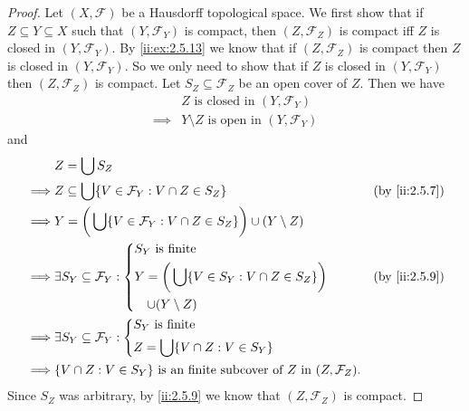 \begin{proof}
  Let \((X, \mathcal{F})\) be a Hausdorff topological space.
  We first show that if \(Z \subseteq Y \subseteq X\) such that \((Y, \mathcal{F}_Y)\) is compact, then \((Z, \mathcal{F}_Z)\) is compact iff \(Z\) is closed in \((Y, \mathcal{F}_Y)\).
  By \cref{ii:ex:2.5.13} we know that if \((Z, \mathcal{F}_Z)\) is compact then \(Z\) is closed in \((Y, \mathcal{F}_Y)\).
  So we only need to show that if \(Z\) is closed in \((Y, \mathcal{F}_Y)\) then \((Z, \mathcal{F}_Z)\) is compact.
  Let \(S_Z \subseteq \mathcal{F}_Z\) be an open cover of \(Z\).
  Then we have
  \begin{align*}
             & Z \text{ is closed in } (Y, \mathcal{F}_Y)           \\
    \implies & Y \setminus Z \text{ is open in } (Y, \mathcal{F}_Y)
  \end{align*}
  and
  \begin{align*}
             & Z = \bigcup S_Z                                                                                                   \\
    \implies & Z \subseteq \bigcup \set{V \in \mathcal{F}_Y : V \cap Z \in S_Z}                               &  & \by{ii:2.5.7} \\
    \implies & Y = \bigg(\bigcup \set{V \in \mathcal{F}_Y : V \cap Z \in S_Z}\bigg) \cup (Y \setminus Z)                         \\
    \implies & \exists S_Y \subseteq \mathcal{F}_Y : \begin{dcases}
                                                       S_Y \text{ is finite}                                      \\
                                                       Y = \bigg(\bigcup \set{V \in S_Y : V \cap Z \in S_Z}\bigg) \\
                                                       \quad \cup (Y \setminus Z)
                                                     \end{dcases}                                  &  & \by{ii:2.5.9}            \\
    \implies & \exists S_Y \subseteq \mathcal{F}_Y : \begin{dcases}
                                                       S_Y \text{ is finite} \\
                                                       Z = \bigcup \set{V \cap Z : V \in S_Y}
                                                     \end{dcases}                                       \\
    \implies & \set{V \cap Z : V \in S_Y} \text{ is an finite subcover of } Z \text{ in } (Z, \mathcal{F}_Z).
  \end{align*}
  Since \(S_Z\) was arbitrary, by \cref{ii:2.5.9} we know that \((Z, \mathcal{F}_Z)\) is compact.


\end{proof}
